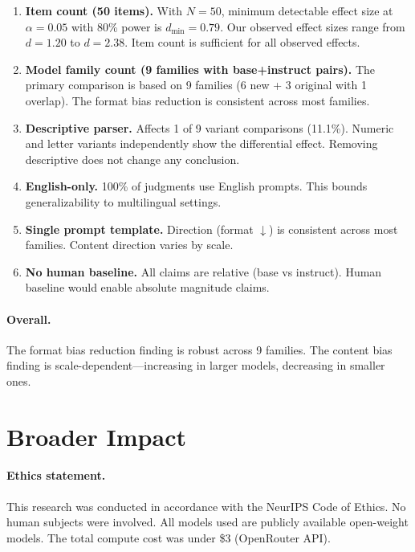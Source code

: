 \documentclass[11pt,preprint,nonatbib]{article}
\begin{document}
\begin{enumerate}
    \item \textbf{Item count (50 items).} With $N=50$, minimum detectable effect size at $\alpha=0.05$ with 80\% power is $d_{\min}=0.79$. Our observed effect sizes range from $d=1.20$ to $d=2.38$. Item count is sufficient for all observed effects.

    \item \textbf{Model family count (9 families with base+instruct pairs).} The primary comparison is based on 9 families (6 new + 3 original with 1 overlap). The format bias reduction is consistent across most families.

    \item \textbf{Descriptive parser.} Affects 1 of 9 variant comparisons (11.1\%). Numeric and letter variants independently show the differential effect. Removing descriptive does not change any conclusion.

    \item \textbf{English-only.} 100\% of judgments use English prompts. This bounds generalizability to multilingual settings.

    \item \textbf{Single prompt template.} Direction (format $\downarrow$) is consistent across most families. Content direction varies by scale.

    \item \textbf{No human baseline.} All claims are relative (base vs instruct). Human baseline would enable absolute magnitude claims.
\end{enumerate}

\paragraph{Overall.} The format bias reduction finding is robust across 9 families. The content bias finding is scale-dependent---increasing in larger models, decreasing in smaller ones.

\section{Broader Impact}

\paragraph{Ethics statement.}
This research was conducted in accordance with the NeurIPS Code of Ethics. No human subjects were involved. All models used are publicly available open-weight models. The total compute cost was under \$3 (OpenRouter API).
\end{document}
